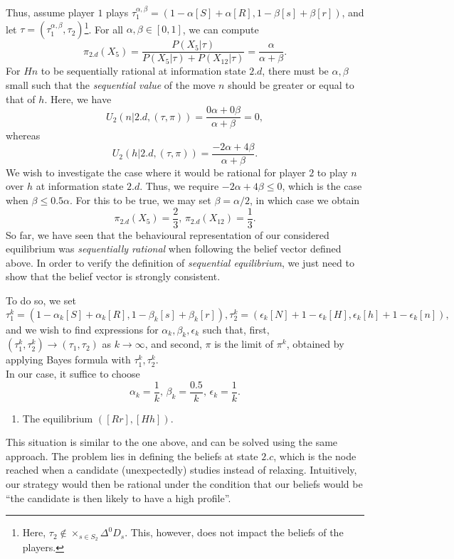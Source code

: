 \begin{example}
Thus, assume player $1$ plays $\tau_1^{\alpha, \beta} = (1-\alpha[S] + \alpha [R],1-\beta[s] + \beta [r] )$, and let $\tau = (\tau_{1}^{\alpha, \beta}, \tau_2)$\footnote{Here, $\tau_2 \not \in \times_{s \in S_2} \Delta^0 D_s$. This, however, does not impact the beliefs of the players.}. 
For all $\alpha, \beta \in [0,1]$, we can compute 
$$\pi_{2.d}(X_5) = \frac{P(X_5 | \tau)}{ P(X_5 | \tau) + P(X_{12} | \tau) }  = \frac{\alpha}{\alpha + \beta}.$$
For $Hn$ to be sequentially rational at information state $2.d$, there must be $\alpha, \beta$ small such that the \emph{sequential value} of the move $n$ should be greater or equal to that of $h$. Here, we have
$$ U_2(n | 2.d, (\tau, \pi)) = \frac{0\alpha+0\beta}{\alpha+\beta} = 0 ,$$
whereas 
$$U_2(h | 2.d, (\tau, \pi)) = \frac{-2 \alpha+ 4\beta}{\alpha+\beta}. $$
We wish to investigate the case where it would be rational for player $2$ to play $n$ over $h$ at information state $2.d$. Thus, we require $-2 \alpha+ 4\beta \leq 0$, which is the case when  $\beta \leq 0.5\alpha$. For this to be true, we may set $\beta = \alpha/2$, in which case we obtain
$$ \pi_{2.d}(X_5) = \frac{2}{3}, \, \pi_{2.d}(X_{12}) = \frac{1}{3}. $$
So far, we have seen that the behavioural representation of our considered equilibrium was \emph{sequentially rational} when following the belief vector defined above. In order to verify the definition of \emph{sequential equilibrium}, we just need to show that the belief vector is strongly consistent. 

To do so, we set $$ \tau_1^k = (1 - \alpha_k [S] + \alpha_k [R], 1-\beta_k [s] + \beta_k [r]), \tau_2^k = (\epsilon_k [N] + 1 - \epsilon_k [H], \epsilon_k [h] +  1-\epsilon_k [n]), $$
and we wish to find expressions for $\alpha_k, \beta_k, \epsilon_k$ such that, first, $(\tau_1^k , \tau_2^k )\rightarrow (\tau_1, \tau_2)$ as $k \rightarrow \infty$, and second, $\pi$ is the limit of $\pi^k$, obtained by applying Bayes formula with $\tau_1^k, \tau_2^k$. \\
In our case, it suffice to choose
$$ \alpha_k =  \frac{1}{k}, \, \beta_k = \frac{0.5}{k}, \, \epsilon_k = \frac{1}{k}.$$


\begin{enumerate}[resume]
\item The equilibrium $([Rr], [Hh])$.
\end{enumerate}

This situation is similar to the one above, and can be solved using the same approach. 
The problem lies in defining the beliefs at state $2.c$, which is the node reached when a candidate  (unexpectedly) studies instead of relaxing. Intuitively, our strategy would then be rational under the condition that our beliefs would be ``the candidate is then likely to have a high profile''.


\end{example}

